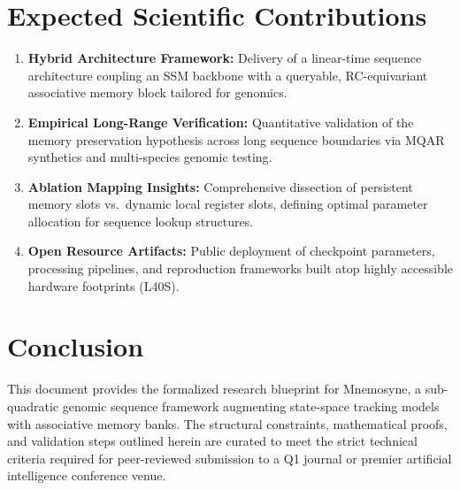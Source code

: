 \documentclass[11pt,a4paper]{article}
\begin{document}
\section{Expected Scientific Contributions}
\begin{enumerate}[label=\textbf{C\arabic*.}, itemsep=6pt]
    \item \textbf{Hybrid Architecture Framework:} Delivery of a linear-time sequence architecture coupling an SSM backbone with a queryable, RC-equivariant associative memory block tailored for genomics.
    \item \textbf{Empirical Long-Range Verification:} Quantitative validation of the memory preservation hypothesis across long sequence boundaries via MQAR synthetics and multi-species genomic testing.
    \item \textbf{Ablation Mapping Insights:} Comprehensive dissection of persistent memory slots vs.\ dynamic local register slots, defining optimal parameter allocation for sequence lookup structures.
    \item \textbf{Open Resource Artifacts:} Public deployment of checkpoint parameters, processing pipelines, and reproduction frameworks built atop highly accessible hardware footprints (L40S).
\end{enumerate}

\section{Conclusion}
This document provides the formalized research blueprint for Mnemosyne, a sub-quadratic genomic sequence framework augmenting state-space tracking models with associative memory banks. The structural constraints, mathematical proofs, and validation steps outlined herein are curated to meet the strict technical criteria required for peer-reviewed submission to a Q1 journal or premier artificial intelligence conference venue.
\end{document}
